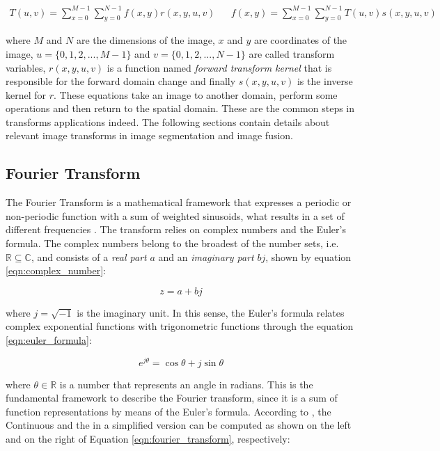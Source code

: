\begin{align}
    \label{eqn:generic_transform}
    T(u,v) = 
    \sum_{x=0}^{M-1}
    \sum_{y=0}^{N-1}f(x,y)r(x,y,u,v)
    &&
    f(x,y) = 
    \sum_{x=0}^{M-1}
    \sum_{y=0}^{N-1}T(u,v)s(x,y,u,v)
\end{align}

\noindent where $M$ and $N$ are the dimensions of the image, $x$ and $y$ are coordinates of the image, $u = \{0,1,2,...,M-1\}$ and $v = \{0,1,2,...,N-1\}$ are called transform variables, $r(x,y,u,v)$ is a function named \emph{forward transform kernel} that is responsible for the forward domain change and finally $s(x,y,u,v)$ is the inverse kernel for $r$. These equations take an image to another domain, perform some operations and then return to the spatial domain. These are the common steps in transforms applications indeed. The following sections contain details about relevant image transforms in image segmentation and image fusion.

\subsection{Fourier Transform}

The Fourier Transform is a mathematical framework that expresses a periodic or non-periodic function with a sum of weighted sinusoids, what results in a set of different frequencies \cite{gonzalez2008digital}. The transform relies on complex numbers and the Euler's formula. The complex numbers belong to the broadest of the number sets, i.e. $\mathbb{R} \subseteq \mathbb{C}$, and consists of a \emph{real part} $a$ and an \emph{imaginary part} $bj$, shown by equation \ref{eqn:complex_number}:

\begin{equation}
\label{eqn:complex_number}
    z = a + bj
\end{equation}

\noindent where $j = \sqrt{-1}$ is the imaginary unit. In this sense, the Euler's formula relates complex exponential functions with trigonometric functions through the equation  \ref{eqn:euler_formula}:

\begin{equation}
\label{eqn:euler_formula}
    e^{j\theta} = \cos{\theta} + j\sin{\theta}
\end{equation}

\noindent where $\theta \in \mathbb{R}$ is a number that represents an angle in radians. This is the fundamental framework to describe the Fourier transform, since it is a sum of function representations by means of the Euler's formula. According to , the Continuous and the  in a simplified version can be computed as shown on the left and on the right of Equation \ref{eqn:fourier_transform}, respectively:

